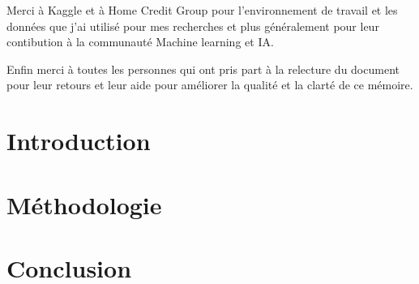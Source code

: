 \documentclass[a4paper,12pt,twoside]{report}
\begin{document}
Merci à Kaggle et à Home Credit Group pour l'environnement de travail et les données que j'ai utilisé pour mes recherches et plus généralement pour leur contibution à la communauté Machine learning et IA.

Enfin merci à toutes les personnes qui ont pris part à la relecture du document pour leur retours et leur aide pour améliorer la qualité et la clarté de ce mémoire.

\vfil

\clearpage

\pagestyle{fancy}

\tableofcontents %



\pagestyle{empty}
\pagestyle{fancy}


\part{Introduction} %


\part{Méthodologie} %



\part{Conclusion} %


\printbibliography[title={Bibliographie}, heading=bibintoc]
\end{document}
